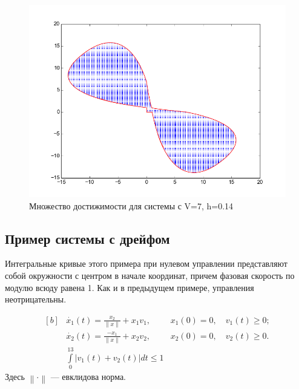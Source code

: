 \begin{figure}
\begin{minipage}[h]{0.47\linewidth}
  \noindent \hfil
  \includegraphics[width=1\linewidth]{img/figure_v_7_h_014.png}
  \hfil \caption{Множество достижимости для системы с V=7, h=0.14}
  \label{fig:v5h0.2}
\end{minipage}
\end{figure}

\subsection{Пример системы с дрейфом}
\label{sec:swd}

Интегральные кривые этого примера при нулевом управлении
представляют собой окружности с центром в начале координат, причем
фазовая скорость по модулю всюду равена 1. Как и в предыдущем примере,
управления неотрицательны.

\begin{equation*}
  \begin{aligned}[b]
    &\dot{x_1}(t) = \frac{x_2}{\left\|x\right\|} + x_1v_1, &x_1(0) =
    0,\quad v_1(t) \ge 0;\\
    &\dot{x_2}(t) = \frac{-x_1}{\left\|x\right\|} + x_2v_2, &x_2(0)
    = 0,\quad v_2(t) \ge 0.\\
    &\int\limits_0^{13} |v_1(t)+ v_2(t)| dt \le 1
  \end{aligned}
\end{equation*}
Здесь $\left\| \cdot \right\|$ --- евклидова норма.

